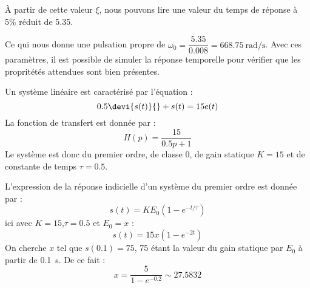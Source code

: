 À partir de cette valeur $\xi$, nous pouvons lire une valeur du temps de réponse
à 5\% réduit de 5.35.
\begin{center}

\end{center}
Ce qui nous donne une pulsation propre de 
$\omega_0=\dfrac{5.35}{0.008}=\SI{668.75}{\radian\per\second}$.
Avec ces paramètres, il est possible de simuler la réponse temporelle pour 
vérifier que les propritétés attendues sont bien présentes.
\begin{center}
    
\end{center}
\clearpage
Un système linéaire est caractérisé par l'équation :
\[
    0.5\devi{s(t)}{}+s(t)=15e(t)
\]
La fonction de transfert est donnée par :
\[
    H(p)=\dfrac{15}{0.5p+1}
\]
Le système est donc du premier ordre, de classe 0, de gain statique $K=15$ et 
de constante de temps $\tau=0.5$.

L'expression de la réponse indicielle d'un système du premier ordre est donnée
par :
\[
    s(t)=KE_0\left(1-e^{-t/\tau}\right)
\]
ici avec $K=15$,$\tau=0.5$ et $E_0=x$ :
\[
    s(t)=15x\left(1-e^{-2t}\right)
\]
On cherche $x$ tel que $s(0.1)=75$, 75 étant la valeur du gain statique par $E_0$ à partir de \SI{0.1}{\second}.
De ce fait :
\[
    x=\dfrac{5}{1-e^{-0.2}}\sim27.5832
\]


